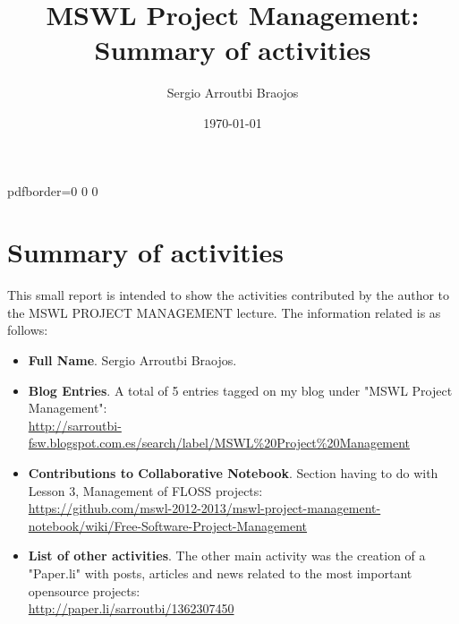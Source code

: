 \documentclass[11pt]{article}
\title{\textbf{MSWL Project Management: Summary of activities}}
\author{Sergio Arroutbi Braojos}
\date{\today}
\begin{document}
\hypersetup
{   
pdfborder={0 0 0}
}
   
\maketitle

\section{Summary of activities}
This small report is intended to show the activities contributed by the author to the MSWL PROJECT MANAGEMENT lecture.
The information related is as follows:
\begin{itemize}
\item{\textbf{Full Name}}. Sergio Arroutbi Braojos.
\item{\textbf{Blog Entries}}. A total of 5 entries tagged on my blog under "MSWL Project Management":\\
\url{http://sarroutbi-fsw.blogspot.com.es/search/label/MSWL\%20Project\%20Management}
\item{\textbf{Contributions to Collaborative Notebook}}. Section having to do with Lesson 3, Management of FLOSS projects:\\
\url{https://github.com/mswl-2012-2013/mswl-project-management-notebook/wiki/Free-Software-Project-Management}
\item{\textbf{List of other activities}}. The other main activity was the creation of a "Paper.li" with posts, articles and news related to the most important opensource projects:\\
\url{http://paper.li/sarroutbi/1362307450}
\end{itemize}
\end{document}
